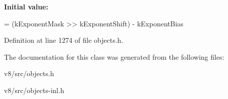 {\bfseries Initial value\+:}
\begin{DoxyCode}
=
      (kExponentMask >> kExponentShift) - kExponentBias
\end{DoxyCode}


Definition at line 1274 of file objects.\+h.



The documentation for this class was generated from the following files\+:\begin{DoxyCompactItemize}
\item 
v8/src/objects.\+h\item 
v8/src/objects-\/inl.\+h\end{DoxyCompactItemize}
